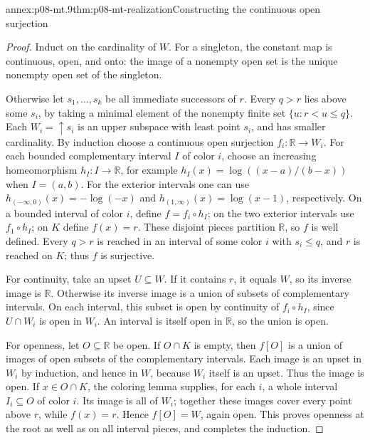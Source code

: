 \begin{annexitem}{annex:p08-mt.9}{thm:p08-mt-realization}{Constructing the continuous open surjection}
\begin{proof}
Induct on the cardinality of \(W\). For a singleton, the constant map
is continuous, open, and onto: the image of a nonempty open set is the
unique nonempty open set of the singleton.

Otherwise let \(s_1,\ldots,s_k\) be all immediate successors of \(r\).
Every \(q>r\) lies above some \(s_i\), by taking a minimal element
of the nonempty finite set \(\{u:r<u\leq q\}\).
Each \(W_i=\uparrow s_i\) is an upper subspace with least point
\(s_i\), and has smaller cardinality. By induction choose a continuous
open surjection \(f_i:\mathbb R\to W_i\).
For each bounded complementary interval \(I\) of color \(i\), choose
an increasing homeomorphism \(h_I:I\to\mathbb R\), for example
\(h_I(x)=\log((x-a)/(b-x))\) when \(I=(a,b)\).
For the exterior intervals one can use
\(h_{(-\infty,0)}(x)=-\log(-x)\) and
\(h_{(1,\infty)}(x)=\log(x-1)\), respectively. On a bounded interval
of color \(i\), define \(f=f_i\circ h_I\); on the two exterior
intervals use \(f_1\circ h_I\); on \(K\) define \(f(x)=r\).
These disjoint pieces partition \(\mathbb R\), so \(f\) is well
defined. Every \(q>r\) is reached in an interval of some color \(i\)
with \(s_i\leq q\), and \(r\) is reached on \(K\); thus \(f\) is
surjective.

For continuity, take an upset \(U\subseteq W\). If it contains
\(r\), it equals \(W\), so its inverse image is \(\mathbb R\).
Otherwise its inverse image is a union of subsets of complementary
intervals. On each interval, this subset is open by continuity of
\(f_i\circ h_I\), since \(U\cap W_i\) is open in \(W_i\).
An interval is itself open in \(\mathbb R\), so the union is open.

For openness, let \(O\subseteq\mathbb R\) be open. If \(O\cap K\)
is empty, then \(f[O]\) is a union of images of open subsets of the
complementary intervals. Each image is an upset in \(W_i\) by induction,
and hence in \(W\), because \(W_i\) itself is an upset. Thus the
image is open. If \(x\in O\cap K\), the coloring lemma supplies,
for each \(i\), a whole interval \(I_i\subseteq O\) of color \(i\).
Its image is all of \(W_i\); together these images cover every point
above \(r\), while \(f(x)=r\). Hence \(f[O]=W\), again open.
This proves openness at the root as well as on all interval pieces,
and completes the induction.
\end{proof}
\end{annexitem}


